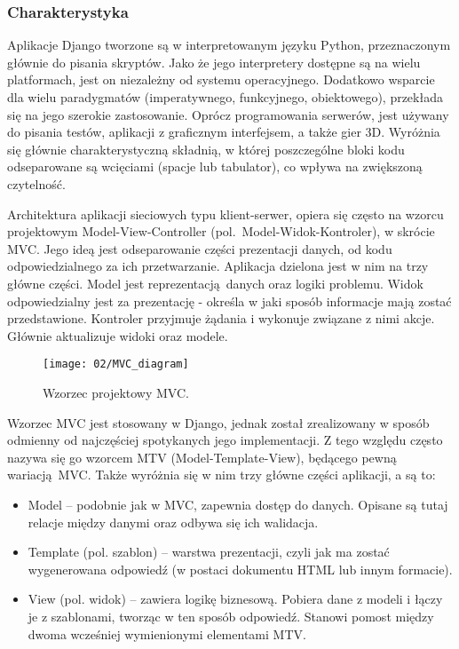 \subsubsection*{Charakterystyka}

Aplikacje Django tworzone są w interpretowanym języku Python, przeznaczonym głównie do pisania skryptów. Jako że jego interpretery dostępne są na wielu platformach, jest on niezależny od systemu operacyjnego. Dodatkowo wsparcie dla wielu paradygmatów (imperatywnego, funkcyjnego, obiektowego), przekłada się na jego szerokie zastosowanie. Oprócz programowania serwerów, jest używany do pisania testów, aplikacji z graficznym interfejsem, a także gier 3D. Wyróżnia się głównie charakterystyczną składnią, w której poszczególne bloki kodu odseparowane są wcięciami (spacje lub tabulator), co wpływa na zwiększoną czytelność.

Architektura aplikacji sieciowych typu klient-serwer, opiera się często na wzorcu projektowym Model-View-Controller (pol.~Model-Widok-Kontroler), w skrócie MVC. Jego ideą jest odseparowanie części prezentacji danych, od kodu odpowiedzialnego za ich przetwarzanie. Aplikacja dzielona jest w nim na trzy główne części. Model jest reprezentacją danych oraz logiki problemu. Widok odpowiedzialny jest za prezentację - określa w jaki sposób informacje mają zostać przedstawione. Kontroler przyjmuje żądania i wykonuje związane z nimi akcje. Głównie aktualizuje widoki oraz modele.

\begin{figure}[h]
	\begin{center}
		\texttt{[image: 02/MVC\_diagram]}
	\end{center}
	\caption{Wzorzec projektowy MVC.}
	\vspace{-0.3cm}
\end{figure}

Wzorzec MVC jest stosowany w Django, jednak został zrealizowany w sposób odmienny od najczęściej spotykanych jego implementacji. Z tego względu często nazywa się go wzorcem MTV (Model-Template-View), będącego pewną wariacją MVC. Także wyróżnia się w nim trzy główne części aplikacji, a są to:

\begin{itemize}
	\item Model -- podobnie jak w MVC, zapewnia dostęp do danych. Opisane są tutaj relacje między danymi oraz odbywa się ich walidacja.
	\item Template (pol. szablon) -- warstwa prezentacji, czyli jak ma zostać wygenerowana odpowiedź (w postaci dokumentu HTML lub innym formacie).
	\item View (pol. widok) -- zawiera logikę biznesową. Pobiera dane z modeli i łączy je z szablonami, tworząc w ten sposób odpowiedź. Stanowi pomost między dwoma wcześniej wymienionymi elementami MTV.
\end{itemize}

